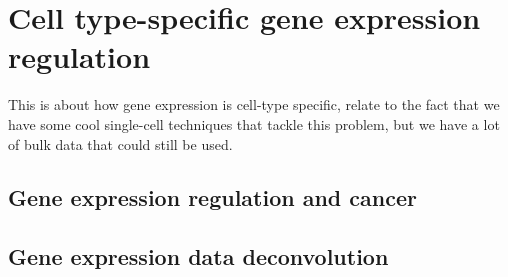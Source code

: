 \chapter{Cell type-specific gene expression regulation}

This is about how gene expression is cell-type specific, relate to the fact that we have some cool single-cell techniques that tackle this problem, but we have a lot of bulk data that could still be used.



  \section{Gene expression regulation and cancer}


  \section{Gene expression data deconvolution}
